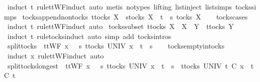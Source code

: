 \begin{isabellebody}
\ {\isacharparenleft}induct\ t\ rule{\isacharcolon}ttWF{\isachardot}induct{\isacharcomma}\ auto{\isacharcomma}\ metis\ {\isacharparenleft}no{\isacharunderscore}types{\isacharcomma}\ lifting{\isacharparenright}\ list{\isachardot}inject\ list{\isachardot}simps{\isacharparenleft}{}{\isacharparenright}\ tocks{\isachardot}simps{\isacharparenright}%
\endisatagproof
{\isafoldproof}%
%
\isadelimproof
\isanewline
%
\endisadelimproof
\isanewline
{}\isamarkupfalse%
\ tocks{\isacharunderscore}append{\isacharunderscore}nontocks{\isacharcolon}\ {\isachardoublequoteopen}t{\isasymin}tocks\ X\ {\isasymLongrightarrow}\ s{\isasymnotin}tocks\ X\ {\isasymLongrightarrow}\ t\ {\isacharat}\ s\ {\isasymnotin}tocks\ X{\isachardoublequoteclose}\isanewline
%
\isadelimproof
\ \ %
\endisadelimproof
%
\isatagproof
{}\isamarkupfalse%
\ tocks{\isachardot}cases\ \isamarkupfalse%
\ {\isacharparenleft}induct\ t\ rule{\isacharcolon}ttWF{\isachardot}induct{\isacharcomma}\ auto{\isacharparenright}%
\endisatagproof
{\isafoldproof}%
%
\isadelimproof
\isanewline
%
\endisadelimproof
\isanewline
{}\isamarkupfalse%
\ tocks{\isacharunderscore}subset{\isacharcolon}\ {\isachardoublequoteopen}t{\isasymin}tocks\ X\ {\isasymLongrightarrow}\ X\ {\isasymsubseteq}\ Y\ {\isasymLongrightarrow}\ t{\isasymin}tocks\ Y{\isachardoublequoteclose}\isanewline
%
\isadelimproof
\ \ %
\endisadelimproof
%
\isatagproof
{}\isamarkupfalse%
\ {\isacharparenleft}induct\ t\ rule{\isacharcolon}tocks{\isachardot}induct{\isacharcomma}\ auto\ simp\ add{\isacharcolon}\ tocks{\isachardot}intros{\isacharparenright}%
\endisatagproof
{\isafoldproof}%
%
\isadelimproof
\isanewline
%
\endisadelimproof
\isanewline
{}\isamarkupfalse%
\ split{\isacharunderscore}tocks{\isacharcolon}\ \ {\isachardoublequoteopen}ttWF\ x\ {\isasymLongrightarrow}\ {\isasymexists}\ s{\isachardot}\ {\isasymexists}t{\isasymin}tocks\ UNIV{\isachardot}\ x\ {\isacharequal}\ t\ {\isacharat}\ s{\isachardoublequoteclose}\isanewline
%
\isadelimproof
\ \ %
\endisadelimproof
%
\isatagproof
{}\isamarkupfalse%
\ tocks{\isachardot}empty{\isacharunderscore}in{\isacharunderscore}tocks\ \isamarkupfalse%
\ {\isacharparenleft}induct\ x\ rule{\isacharcolon}ttWF{\isachardot}induct{\isacharcomma}\ auto{\isacharparenright}%
\endisatagproof
{\isafoldproof}%
%
\isadelimproof
\isanewline
%
\endisadelimproof
\isanewline
{}\isamarkupfalse%
\ split{\isacharunderscore}tocks{\isacharunderscore}longest{\isacharcolon}\ \ {\isachardoublequoteopen}ttWF\ x\ {\isasymLongrightarrow}\ {\isasymexists}\ s{\isachardot}\ {\isasymexists}t{\isasymin}tocks\ UNIV{\isachardot}\ x\ {\isacharequal}\ t\ {\isacharat}\ s\ {\isasymand}\ {\isacharparenleft}{\isasymforall}t{\isacharprime}{\isasymin}tocks\ UNIV{\isachardot}\ t{\isacharprime}\ {\isasymle}\isactrlsub C\ x\ {\isasymlongrightarrow}\ t{\isacharprime}\ {\isasymle}\isactrlsub C\ t{\isacharparenright}{\isachardoublequoteclose}\isanewline

\end{isabellebody}
